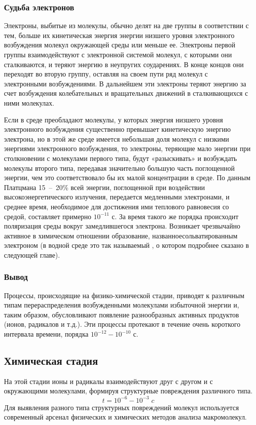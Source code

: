 \documentclass[a4paper, 14pt]{article}
\renewcommand{\emph}[1]{{\color{orange}{\textit{\textbf{#1}}}}}
\begin{document}
\subsubsection{Судьба электронов}
Электроны, выбитые из молекулы, обычно делят на две группы в соответствии с
тем, больше их кинетическая энергия энергии низшего уровня электронного
возбуждения молекул окружающей среды или меньше ее. Электроны первой группы
взаимодействуют с электронной системой молекул, с которыми они сталкиваются, и
теряют энергию в неупругих соударениях. В конце концов они переходят во вторую
группу, оставляя на своем пути ряд молекул с электронными возбуждениями. В
дальнейшем эти электроны теряют энергию за счет возбуждения колебательных и
вращательных движений в сталкивающихся с ними молекулах.

Если в среде преобладают молекулы, у которых энергия низшего уровня
электронного возбуждения существенно превышает кинетическую энергию электрона,
но в этой же среде имеется небольшая доля молекул с низкими энергиями
электронного возбуждения, то электроны, теряющие мало энергии при столкновении с
молекулами первого типа, будут «разыскивать» и возбуждать молекулы второго типа,
передавая значительно большую часть поглощенной энергии, чем это соответствовало
бы их малой концентрации в среде. По данным Платцмана 15~--~20\% всей энергии,
поглощенной при воздействии высокоэнергетического излучения, передается
медленными электронами, и среднее время, необходимое для достижения ими
теплового равновесия со средой, составляет примерно $10^{-11}$ с. За время такого же
порядка происходит поляризация среды вокруг замедлившегося электрона. Возникает
чрезвычайно активное в химическом отношении образование, названноесольватированным электроном (в водной среде это так называемый \emph{«гидратированный электрон»}, о котором подробнее сказано в
 следующей главе). %

\subsubsection{Вывод}
Процессы, происходящие на физико-химической стадии, приводят к различным
типам перераспределения возбужденными молекулами избыточной энергии и, таким
образом, обусловливают появление разнообразных активных продуктов (ионов,
радикалов и т.д.). Эти процессы протекают в течение очень короткого интервала
времени, порядка $10^{-12}-10^{-10}$ с.

\subsection{Химическая стадия}
На этой стадии ионы и радикалы взаимодействуют друг с другом и с окружающими молекулами, формируя структурные повреждения различного типа.
\[ t = 10^{-6} - 10^{-3}\;c\]
Для выявления разного типа структурных повреждений молекул используется
современный арсенал физических и химических методов анализа макромолекул.
\end{document}
